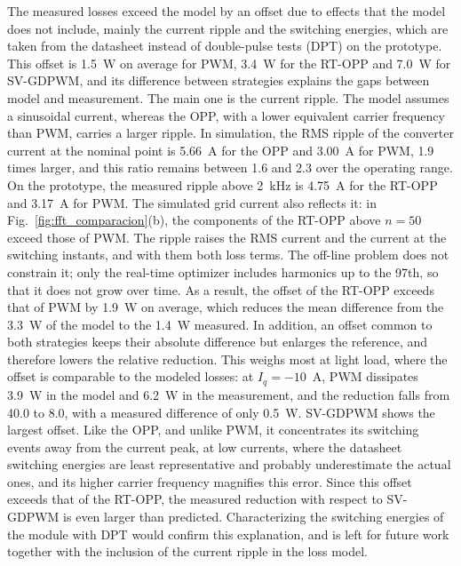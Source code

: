 \documentclass[conference]{IEEEtran}
\newcommand{\pct}{\text{\char`\%}}
\newcommand{\old}[1]{\par\smallskip\noindent{\color{gray}\footnotesize
    \textbf{[ANTES]} #1}\par\smallskip}
\renewcommand{\old}[1]{}       %
\begin{document}
The measured losses exceed the model by an offset due to effects that
the model does not include, mainly the current ripple and the switching
energies, which are taken from the datasheet instead of double-pulse tests
(DPT) on the prototype. This offset is 1.5~W on average for PWM, 3.4~W for
the RT-OPP and 7.0~W for SV-GDPWM, and its difference between strategies
explains the gaps between model and measurement. The main one is the
current ripple. The model assumes a sinusoidal current, whereas the OPP,
with a lower equivalent carrier frequency than PWM, carries a larger
ripple. In simulation,
the RMS ripple of the converter current at the nominal point is 5.66~A for
the OPP and 3.00~A for PWM, 1.9 times larger, and this ratio remains between
1.6 and 2.3 over the operating range. On the prototype, the measured
ripple above 2~kHz is 4.75~A for the RT-OPP and 3.17~A for PWM. The simulated grid current also
reflects it: in Fig.~\ref{fig:fft_comparacion}(b), the components of the
RT-OPP above $n = 50$ exceed those of PWM. The ripple raises the RMS current and the current at the
switching instants, and with them both loss terms. The off-line problem
does not constrain it; only the real-time optimizer includes harmonics up
to the 97th, so that it does not grow over time. As a result, the offset of
the RT-OPP exceeds that of PWM by 1.9~W on average, which reduces the mean
difference from the 3.3~W of the model to the 1.4~W measured. In addition,
an offset common to both strategies keeps their absolute difference but
enlarges the reference, and therefore lowers the relative reduction. This
weighs most at light load, where the offset is comparable to the modeled
losses: at $I_q = -10$~A, PWM dissipates 3.9~W in the model and 6.2~W in
the measurement, and the reduction falls from 40.0 to 8.0\pct{}, with a
measured difference of only 0.5~W. SV-GDPWM shows the largest offset. Like
the OPP, and unlike PWM, it concentrates its switching events away from the
current peak, at low currents, where the datasheet switching energies are
least representative and probably underestimate the actual ones, and its
higher carrier frequency magnifies this error. Since this offset exceeds
that of the RT-OPP, the measured reduction with respect to SV-GDPWM is even
larger than predicted. Characterizing the switching energies of the module
with DPT would confirm this explanation, and is left for future work
together with the inclusion of the current ripple in the loss model.
\old{Three effects explain this gap. First, the measured losses exceed the model by an offset [\dots] For PWM this offset is nearly constant, between 4.3 and 6.5~W. [\dots] Second, this effect is strongest at light load [\dots] Third, the model assumes a sinusoidal current, whereas the OPP [\dots] carries a larger current ripple [\dots] SV-GDPWM shows the largest offset, 11.0~W on average. [\dots] the measured reduction with respect to SV-GDPWM remains close to the model. [\dots]}
\end{document}
